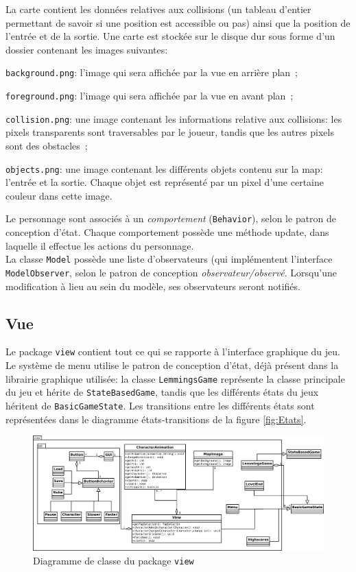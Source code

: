 \documentclass[a4paper,12pt]{article}
\begin{document}
La carte contient les données relatives aux collisions (un tableau
d'entier permettant de savoir si une position est accessible ou pas)
ainsi que la position de l'entrée et de la sortie. Une carte est
stockée sur le disque dur sous forme d'un dossier contenant les images
suivantes:
\begin{list}{-}{}
  \item \texttt{background.png}: l'image qui sera affichée par la vue
    en arrière plan~;
  \item \texttt{foreground.png}: l'image qui sera affichée par la vue
    en avant plan~;
  \item \texttt{collision.png}: une image contenant les informations
    relative aux collisions: les pixels transparents sont traversables
    par le joueur, tandis que les autres pixels sont des obstacles~;
  \item \texttt{objects.png}: une image contenant les différents
    objets contenu sur la map: l'entrée et la sortie.  Chaque objet
    est représenté par un pixel d'une certaine couleur dans cette
    image.
\end{list}

Le personnage sont associés à un \emph{comportement}
(\texttt{Behavior}), selon le patron de conception d'état.  Chaque
comportement possède une méthode update, dans laquelle il effectue les
actions du personnage.\\

La classe \texttt{Model} possède une liste d'observateurs (qui
implémentent l'interface \texttt{ModelObserver}, selon le patron de
conception \emph{observateur/observé}. Lorsqu'une modification à lieu
au sein du modèle, ses observateurs seront notifiés.

\subsection{Vue}
Le package \texttt{view} contient tout ce qui se rapporte à
l'interface graphique du jeu. Le système de menu utilise le patron de
conception d'état, déjà présent dans la librairie graphique utilisée:
la classe \texttt{LemmingsGame} représente la classe principale du jeu
et hérite de \texttt{StateBasedGame}, tandis que les différents états
du jeux héritent de \texttt{BasicGameState}. Les transitions entre les
différents états sont représentées dans le diagramme états-transitions
de la figure \ref{fig:Etats}.

\begin{figure}[ht!]
  \centerline{
  \includegraphics[width=\textwidth]{view.png}}
  \caption{Diagramme de classe du package \texttt{view}}
\end{figure}
\end{document}
